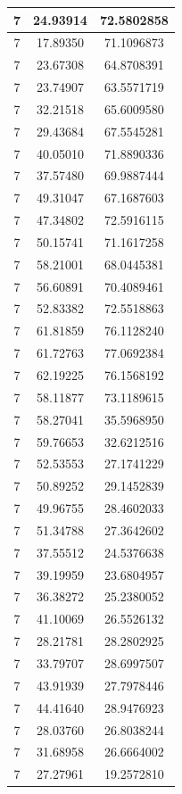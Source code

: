 \documentclass[
]{book}
\begin{document}
\begin{tabular}{c|c|c}
\hline
7 & 24.93914 & 72.5802858\\
\hline
7 & 17.89350 & 71.1096873\\
\hline
7 & 23.67308 & 64.8708391\\
\hline
7 & 23.74907 & 63.5571719\\
\hline
7 & 32.21518 & 65.6009580\\
\hline
7 & 29.43684 & 67.5545281\\
\hline
7 & 40.05010 & 71.8890336\\
\hline
7 & 37.57480 & 69.9887444\\
\hline
7 & 49.31047 & 67.1687603\\
\hline
7 & 47.34802 & 72.5916115\\
\hline
7 & 50.15741 & 71.1617258\\
\hline
7 & 58.21001 & 68.0445381\\
\hline
7 & 56.60891 & 70.4089461\\
\hline
7 & 52.83382 & 72.5518863\\
\hline
7 & 61.81859 & 76.1128240\\
\hline
7 & 61.72763 & 77.0692384\\
\hline
7 & 62.19225 & 76.1568192\\
\hline
7 & 58.11877 & 73.1189615\\
\hline
7 & 58.27041 & 35.5968950\\
\hline
7 & 59.76653 & 32.6212516\\
\hline
7 & 52.53553 & 27.1741229\\
\hline
7 & 50.89252 & 29.1452839\\
\hline
7 & 49.96755 & 28.4602033\\
\hline
7 & 51.34788 & 27.3642602\\
\hline
7 & 37.55512 & 24.5376638\\
\hline
7 & 39.19959 & 23.6804957\\
\hline
7 & 36.38272 & 25.2380052\\
\hline
7 & 41.10069 & 26.5526132\\
\hline
7 & 28.21781 & 28.2802925\\
\hline
7 & 33.79707 & 28.6997507\\
\hline
7 & 43.91939 & 27.7978446\\
\hline
7 & 44.41640 & 28.9476923\\
\hline
7 & 28.03760 & 26.8038244\\
\hline
7 & 31.68958 & 26.6664002\\
\hline
7 & 27.27961 & 19.2572810\\

\end{tabular}
\end{document}
